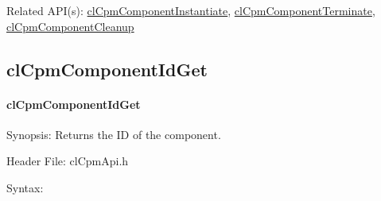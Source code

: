 {\begin{Desc}
\item[Related API(s):]\hyperlink{group__group14}{cl\-Cpm\-Component\-Instantiate}, \hyperlink{group__group14}{cl\-Cpm\-Component\-Terminate}, \hyperlink{group__group14}{cl\-Cpm\-Component\-Cleanup} \end{Desc}
\newpage




\subsection{clCpmComponentIdGet}
\hypertarget{pagecpm130}{}\paragraph{cl\-Cpm\-Component\-Id\-Get}\label{pagecpm130}
\begin{Desc}
\item[Synopsis:]Returns the ID of the component.\end{Desc}
\begin{Desc}
\item[Header File:]clCpmApi.h\end{Desc}
\begin{Desc}
\item[Syntax:]


\end{Desc}}
